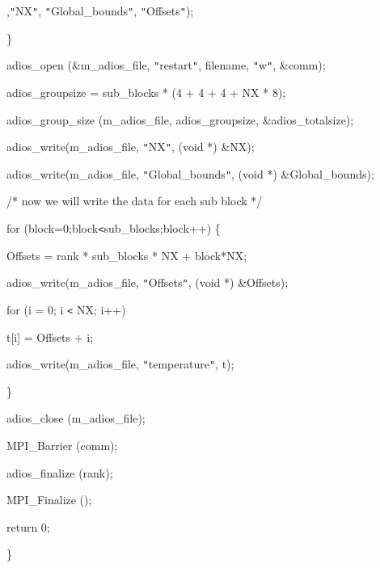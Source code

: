 ,\texttt{"}NX\texttt{"}, \texttt{"}Global\_bounds\texttt{"}, \texttt{"}Offsets\texttt{"});

\parindent=115pt
\}

\parindent=28pt
adios\_open (\&m\_adios\_file, \texttt{"}restart\texttt{"}, filename, \texttt{"}w\texttt{"}, 
\&comm);

adios\_groupsize = sub\_blocks * (4 + 4 + 4 + NX * 8);

\parindent=57pt
adios\_group\_size (m\_adios\_file, adios\_groupsize, \&adios\_totalsize);

\parindent=28pt
adios\_write(m\_adios\_file, \texttt{"}NX\texttt{"}, (void *) \&NX);

adios\_write(m\_adios\_file, \texttt{"}Global\_bounds\texttt{"}, (void *) \&Global\_bounds);

\parindent=54pt
/* now we will write the data for each sub block */

\parindent=28pt
for (block=0;block\texttt{<}sub\_blocks;block++) \{

\parindent=39pt
Offsets = rank * sub\_blocks * NX + block*NX;

adios\_write(m\_adios\_file, \texttt{"}Offsets\texttt{"}, (void *) \&Offsets);

\parindent=79pt
for (i = 0; i \texttt{<} NX; i++)

\parindent=54pt
t[i] = Offsets + i;

\parindent=39pt
adios\_write(m\_adios\_file, \texttt{"}temperature\texttt{"}, t);

\parindent=28pt
\}

adios\_close (m\_adios\_file);

\parindent=57pt
MPI\_Barrier (comm);

\parindent=28pt
adios\_finalize (rank);

MPI\_Finalize ();

\parindent=57pt
return 0;

\parindent=0pt
\}
